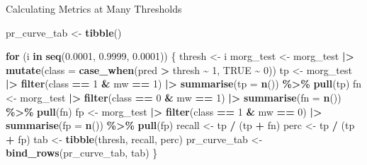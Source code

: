 \documentclass[
  ignorenonframetext,
]{beamer}
\newenvironment{Shaded}{\begin{snugshade}}{\end{snugshade}}
\newcommand{\AttributeTok}[1]{\textcolor[rgb]{0.13,0.29,0.53}{#1}}
\newcommand{\ConstantTok}[1]{\textcolor[rgb]{0.56,0.35,0.01}{#1}}
\newcommand{\ControlFlowTok}[1]{\textcolor[rgb]{0.13,0.29,0.53}{\textbf{#1}}}
\newcommand{\DecValTok}[1]{\textcolor[rgb]{0.00,0.00,0.81}{#1}}
\newcommand{\FloatTok}[1]{\textcolor[rgb]{0.00,0.00,0.81}{#1}}
\newcommand{\FunctionTok}[1]{\textcolor[rgb]{0.13,0.29,0.53}{\textbf{#1}}}
\newcommand{\NormalTok}[1]{#1}
\newcommand{\OtherTok}[1]{\textcolor[rgb]{0.56,0.35,0.01}{#1}}
\newcommand{\SpecialCharTok}[1]{\textcolor[rgb]{0.81,0.36,0.00}{\textbf{#1}}}
\begin{document}
\begin{frame}[fragile]{Calculating Metrics at Many Thresholds}
\label{calculating-metrics-at-many-thresholds-1}
\tiny

\begin{Shaded}
\begin{Highlighting}[]
\NormalTok{pr\_curve\_tab }\OtherTok{\textless{}{-}} \FunctionTok{tibble}\NormalTok{()}

\ControlFlowTok{for}\NormalTok{ (i }\ControlFlowTok{in} \FunctionTok{seq}\NormalTok{(}\FloatTok{0.0001}\NormalTok{, }\FloatTok{0.9999}\NormalTok{, }\FloatTok{0.0001}\NormalTok{)) \{}
\NormalTok{  thresh }\OtherTok{\textless{}{-}}\NormalTok{ i}
\NormalTok{  morg\_test }\OtherTok{\textless{}{-}}\NormalTok{ morg\_test }\SpecialCharTok{|\textgreater{}}
    \FunctionTok{mutate}\NormalTok{(}\AttributeTok{class =} \FunctionTok{case\_when}\NormalTok{(pred }\SpecialCharTok{\textgreater{}}\NormalTok{ thresh }\SpecialCharTok{\textasciitilde{}} \DecValTok{1}\NormalTok{,}
                           \ConstantTok{TRUE} \SpecialCharTok{\textasciitilde{}} \DecValTok{0}\NormalTok{))}
\NormalTok{  tp }\OtherTok{\textless{}{-}}\NormalTok{ morg\_test }\SpecialCharTok{|\textgreater{}}
    \FunctionTok{filter}\NormalTok{(class }\SpecialCharTok{==} \DecValTok{1} \SpecialCharTok{\&}\NormalTok{ mw }\SpecialCharTok{==} \DecValTok{1}\NormalTok{) }\SpecialCharTok{|\textgreater{}}
    \FunctionTok{summarise}\NormalTok{(}\AttributeTok{tp =} \FunctionTok{n}\NormalTok{()) }\SpecialCharTok{\%\textgreater{}\%}
    \FunctionTok{pull}\NormalTok{(tp)}
\NormalTok{  fn }\OtherTok{\textless{}{-}}\NormalTok{ morg\_test }\SpecialCharTok{|\textgreater{}}
    \FunctionTok{filter}\NormalTok{(class }\SpecialCharTok{==} \DecValTok{0} \SpecialCharTok{\&}\NormalTok{ mw }\SpecialCharTok{==} \DecValTok{1}\NormalTok{) }\SpecialCharTok{|\textgreater{}}
    \FunctionTok{summarise}\NormalTok{(}\AttributeTok{fn =} \FunctionTok{n}\NormalTok{()) }\SpecialCharTok{\%\textgreater{}\%}
    \FunctionTok{pull}\NormalTok{(fn)}
\NormalTok{  fp }\OtherTok{\textless{}{-}}\NormalTok{ morg\_test }\SpecialCharTok{|\textgreater{}}
    \FunctionTok{filter}\NormalTok{(class }\SpecialCharTok{==} \DecValTok{1} \SpecialCharTok{\&}\NormalTok{ mw }\SpecialCharTok{==} \DecValTok{0}\NormalTok{) }\SpecialCharTok{|\textgreater{}}
    \FunctionTok{summarise}\NormalTok{(}\AttributeTok{fp =} \FunctionTok{n}\NormalTok{()) }\SpecialCharTok{\%\textgreater{}\%}
    \FunctionTok{pull}\NormalTok{(fp)}
\NormalTok{  recall }\OtherTok{\textless{}{-}}\NormalTok{ tp }\SpecialCharTok{/}\NormalTok{ (tp }\SpecialCharTok{+}\NormalTok{ fn)}
\NormalTok{  perc }\OtherTok{\textless{}{-}}\NormalTok{ tp }\SpecialCharTok{/}\NormalTok{ (tp }\SpecialCharTok{+}\NormalTok{ fp)}
\NormalTok{  tab }\OtherTok{\textless{}{-}} \FunctionTok{tibble}\NormalTok{(thresh, recall, perc)}
\NormalTok{  pr\_curve\_tab }\OtherTok{\textless{}{-}} \FunctionTok{bind\_rows}\NormalTok{(pr\_curve\_tab, tab)}
\NormalTok{\}}
\end{Highlighting}
\end{Shaded}
\end{frame}
\end{document}
